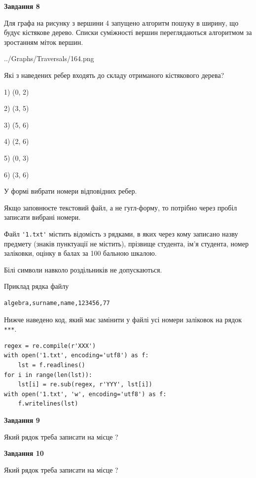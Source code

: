 \documentclass[12pt, ukrainian]{article}
\def\code#1{\Verb!#1!}
\begin{document}
{\begin {large}
{\begin {center}\textbf{Завдання 8}\end {center}}\par
Для графа на рисунку з вершини 4 запущено алгоритм пошуку в ширину, що будує кістякове дерево. Списки суміжності вершин переглядаються алгоритмом за зростанням міток вершин.\par
\begin{center}
	{../Graphs/Traversals/164.png}
\end{center}
\par Які з наведених ребер входять до складу отриманого кістякового дерева?\par
1) (0, 2)\par
2) (3, 5)\par
3) (5, 6)\par
4) (2, 6)\par
5) (0, 3)\par
6) (3, 6)\par
{\vskip 15pt} У формі вибрати номери відповідних ребер.


Якщо заповнюєте текстовий файл, а не гугл-форму, то потрібно через пробіл записа\-ти вибрані номери.\par
\newpage


Файл \code{'1.txt'} містить відомість з рядками, в яких через кому записа\-но назву предмету (знаків пунктуації не містить), прізвище студента, ім'я студента, номер залі\-ков\-ки, оцінку в балах за 100 бальною шкалою.

Білі символи навколо роздільників не допускаються.

Приклад рядка файлу



\begin{verbatim}
algebra,surname,name,123456,77
\end{verbatim}


Нижче наведено код, який має замінити у файлі усі номери заліковок на рядок \code{***}.



\begin{verbatim}
regex = re.compile(r'XXX')
with open('1.txt', encoding='utf8') as f:
    lst = f.readlines()
for i in range(len(lst)):
    lst[i] = re.sub(regex, r'YYY', lst[i])
with open('1.txt', 'w', encoding='utf8') as f:
    f.writelines(lst)
\end{verbatim}




{\begin {center}\textbf{Завдання 9}\end {center}}\par
Який рядок треба записати на місце  ?\par
\vspace{5mm}


{\begin {center}\textbf{Завдання 10}\end {center}}\par
Який рядок треба записати на місце  ?\par


\newpage


\end {large}}
\end{document}
